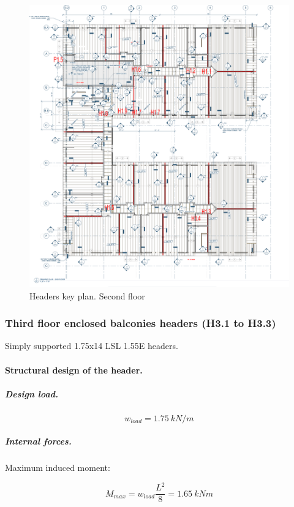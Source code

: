\begin{figure}
  \begin{center}
  \includegraphics[width=120mm]{figures/headers/headers_key_plan_2nd_floor}
  \end{center}
  \caption{Headers key plan. Second floor}\label{fg_headers_key_plan_2nd_floor}
\end{figure}

\subsubsection{Third floor enclosed balconies headers (H3.1 to H3.3)}
Simply supported 1.75x14 LSL 1.55E headers.

\paragraph{Structural design of the header.}

\subparagraph{Design load.}

\begin{equation}
  w_{load}= 1.75\ kN/m
\end{equation}

\subparagraph{Internal forces.}

\noindent Maximum induced moment:

\begin{equation}
  M_{max}= w_{load} \frac{L^2}{8}= 1.65\ kN m
\end{equation}


